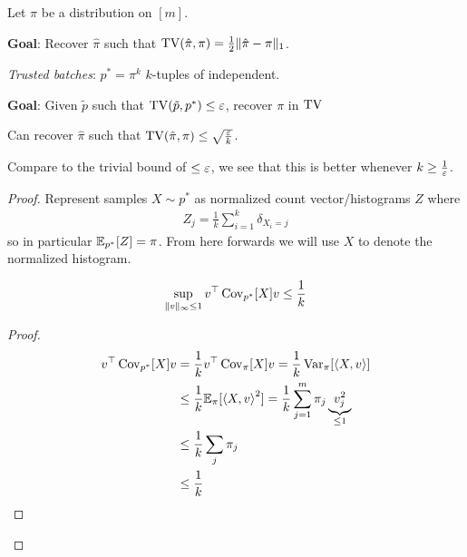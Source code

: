 \begin{example}
  Let $\pi$ be a distribution on $[m]$.

  \textbf{Goal}: Recover $\hat\pi$ such that
  $\operatorname{TV}(\hat\pi, \pi) = \frac{1}{2} \|\hat\pi - \pi\|_1$.


  \emph{Trusted batches}: $p^* = \pi^k$ $k$-tuples of independent.

  \textbf{Goal}: Given $\tilde{p}$ such that $\operatorname{TV}(\tilde{p}, p^*) \leq \varepsilon$,
  recover $\pi$ in $\operatorname{TV}$

  \begin{proposition}
    Can recover $\hat\pi$ such that
    $\operatorname{TV}(\hat{\pi}, \pi) \leq \sqrt{\frac{\varepsilon}{k}}$.

  \end{proposition}

  \begin{remark}
    Compare to the trivial bound of $\leq \varepsilon$, we see that
    this is better whenever $k \geq \frac{1}{\varepsilon}$.
  \end{remark}

  \begin{proof}
    Represent samples $X \sim p^*$ as normalized count vector/histograms $Z$
    where
    \begin{align}
      Z_j = \frac{1}{k} \sum_{i=1}^k \delta_{X_i = j}
    \end{align}
    so in particular $\mathbb{E}_{p^*}[Z] = \pi$. From here forwards we will
    use $X$ to denote the normalized histogram.
    \begin{lemma}
      \begin{align}
        \sup_{\|v\|_\infty \leq 1} v^\top \operatorname{Cov}_{p^*}[X] v \leq \frac{1}{k}
      \end{align}
    \end{lemma}
    \begin{proof}
      \begin{align}
        v^\top \operatorname{Cov}_{p^*}[X] v
        &= \frac{1}{k} v^\top \operatorname{Cov}_{\pi}[X] v
        = \frac{1}{k} \operatorname{Var}_\pi[\braket{X, v}] \\
        &\leq \frac{1}{k} \mathbb{E}_\pi[\braket{X, v}^2]
        = \frac{1}{k} \sum_{j=1}^m \pi_j \underbrace{v_j^2}_{\leq 1} \\
        &\leq \frac{1}{k} \sum_j \pi_j \\
        &\leq \frac{1}{k}
      \end{align}
    \end{proof}
  \end{proof}
\end{example}

